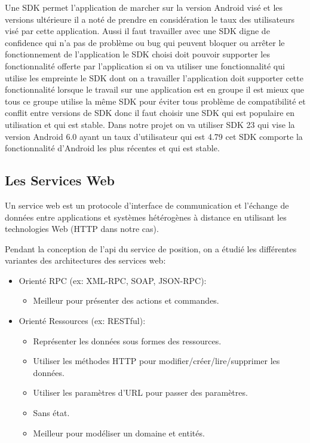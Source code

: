 Une SDK permet l'application de marcher sur la version Android visé et les
versions ultérieure il a noté de prendre en considération le taux des
utilisateurs visé par cette application. Aussi il faut travailler avec une SDK
digne de confidence qui n'a pas de problème ou bug qui peuvent bloquer ou
arrêter le fonctionnement de l'application le SDK choisi doit pouvoir supporter
les fonctionnalité offerte par l'application si on va utiliser une
fonctionnalité qui utilise les empreinte le SDK dont on a travailler
l'application doit supporter cette fonctionnalité lorsque le travail sur une
application est en groupe il est mieux que tous ce groupe utilise la même SDK
pour éviter tous problème de compatibilité et conflit entre versions de SDK
donc il faut choisir une SDK qui est populaire en utilisation et qui est
stable. Dans notre projet on va utiliser SDK 23 qui vise la version Android 6.0
ayant un taux d'utilisateur qui est 4.79 %
cet SDK comporte la fonctionnalité d'Android les plus récentes et qui est
stable.

\subsection{Les Services Web}

Un service web est un protocole d'interface de communication et l'échange de
données entre applications et systèmes hétérogènes à distance en utilisant les
technologies Web (HTTP dans notre cas).

Pendant la conception de l'api du service de position, on a étudié les
différentes variantes des architectures des services web:

\begin{itemize}
    \item Orienté RPC (ex: XML-RPC, SOAP, JSON-RPC):
        \begin{itemize}
            \item Meilleur pour présenter des actions et commandes.
        \end{itemize}
    \item Orienté Ressources (ex: RESTful):
        \begin{itemize}
            \item Représenter les données sous formes des ressources.
            \item Utiliser les méthodes HTTP pour modifier/créer/lire/supprimer
                les données.
            \item Utiliser les paramètres d'URL pour passer des paramètres.
            \item Sans état.
            \item Meilleur pour modéliser un domaine et entités.
        \end{itemize}
\end{itemize}

